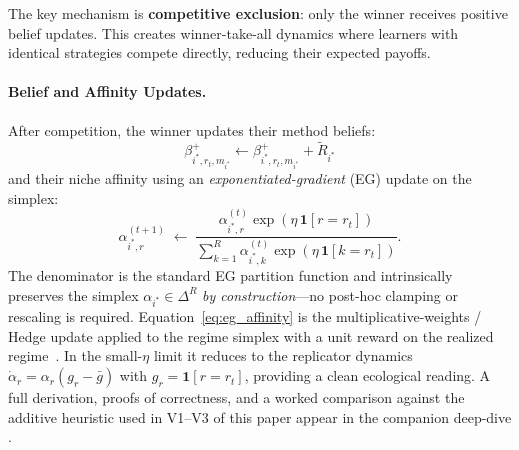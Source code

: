 \documentclass{article}
\begin{document}
The key mechanism is \textbf{competitive exclusion}: only the winner receives positive belief updates. This creates winner-take-all dynamics where learners with identical strategies compete directly, reducing their expected payoffs.

\paragraph{Belief and Affinity Updates.} After competition, the winner updates their method beliefs:
\begin{equation}
    \beta_{i^*,r_t,m_{i^*}}^+ \leftarrow \beta_{i^*,r_t,m_{i^*}}^+ + \tilde{R}_{i^*}
\end{equation}
and their niche affinity using an \emph{exponentiated-gradient} (EG) update on the simplex:
\begin{equation}
\label{eq:eg_affinity}
    \alpha_{i^*,r}^{(t+1)}
    \;\leftarrow\;
    \frac{\alpha_{i^*,r}^{(t)} \exp\!\left(\eta \,\mathbf{1}[r = r_t]\right)}
         {\sum_{k=1}^{R} \alpha_{i^*,k}^{(t)} \exp\!\left(\eta \,\mathbf{1}[k = r_t]\right)}.
\end{equation}
The denominator is the standard EG partition function and intrinsically preserves the
simplex $\alpha_{i^*} \in \Delta^R$ \emph{by construction}---no post-hoc clamping or
rescaling is required. Equation~\eqref{eq:eg_affinity} is the multiplicative-weights /
Hedge update applied to the regime simplex with a unit reward on the realized
regime~\cite{kivinen1997exponentiated, freund1997decision, arora2012multiplicative}. In the small-$\eta$ limit
it reduces to the replicator dynamics $\dot{\alpha}_r = \alpha_r(g_r - \bar{g})$ with
$g_r = \mathbf{1}[r = r_t]$, providing a clean ecological reading. A full derivation,
proofs of correctness, and a worked comparison against the
additive heuristic used in V1--V3 of this paper appear in the companion deep-dive
\cite{li2026emergent}.
\end{document}
